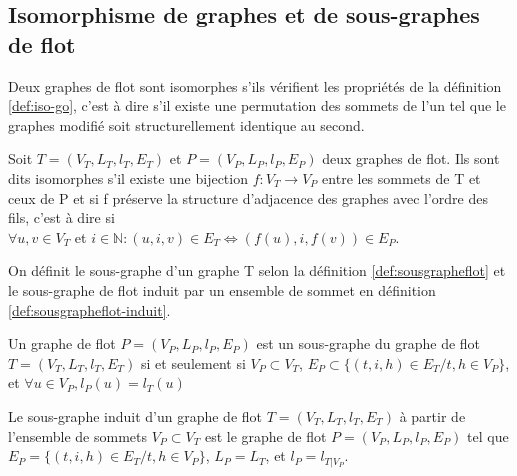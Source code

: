 \subsection{Isomorphisme de graphes et de sous-graphes de flot}
Deux graphes de flot sont isomorphes s'ils vérifient les
propriétés de la définition \ref{def:iso-go}, c'est à dire s'il existe une permutation des sommets de l'un tel que le graphes modifié soit structurellement identique au second.

\begin{defi}\label{def:iso-go}
Soit $T=(V_T, L_T, l_T, E_T)$ et $P=(V_P, L_P, l_P, E_P)$ deux graphes de flot. Ils sont dits isomorphes s'il existe une bijection $f:V_T\rightarrow V_P$ entre les sommets de T et ceux de P et
si f préserve la structure d'adjacence des graphes avec l'ordre des fils, c'est à dire si \\
$\forall u, v \in V_T$ et $i\in\mathbb{N} : (u, i, v) \in E_T \Leftrightarrow (f(u), i, f(v)) \in E_P$.
\end{defi}

On définit le sous-graphe d'un graphe T selon la définition \ref{def:sousgrapheflot} et le sous-graphe de flot induit par un ensemble de sommet en définition \ref{def:sousgrapheflot-induit}.

\begin{defi}\label{def:sousgrapheflot}
Un graphe de flot $P=(V_P, L_P, l_P, E_P)$ est un sous-graphe du graphe de flot $T=(V_T, L_T, l_T, E_T)$ si et seulement si $V_P \subset V_T$, $E_P\subset\{(t, i, h)\in E_T / t, h \in V_P \}$, et $\forall u\in V_P, l_P(u)=l_T(u)$
\end{defi}

\begin{defi}\label{def:sousgrapheflot-induit}
Le sous-graphe induit d'un graphe de flot $T=(V_T, L_T, l_T, E_T)$ à partir de l'ensemble de sommets $V_P \subset V_T$ est le graphe de flot $P=(V_P, L_P, l_P, E_P)$ tel que $E_P=\{(t, i, h)\in E_T / t, h \in V_P \}$, $L_P=L_T$, et $l_P=l_{T\vert V_P}$.
\end{defi}

% 


